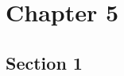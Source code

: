 \documentclass[9pt]{article}
\begin{document}
   \section{Chapter 5}
      \subsection{Section 1}
         
\end{document}
